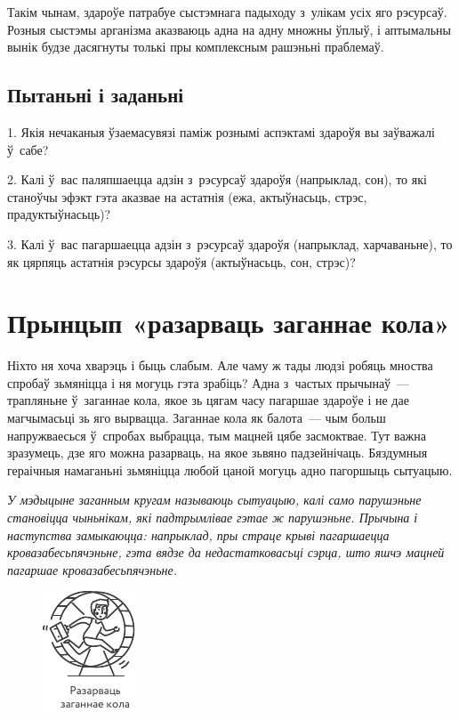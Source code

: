 Такім чынам, здароўе патрабуе сыстэмнага падыходу з~улікам усіх яго рэсурсаў. Розныя сыстэмы арганізма аказваюць адна на адну множны ўплыў, і аптымальны вынік будзе дасягнуты толькі пры комплексным рашэньні праблемаў.

\subsection*{Пытаньні і заданьні}

1. Якія нечаканыя ўзаемасувязі паміж рознымі аспэктамі здароўя вы заўважалі ў~сабе?

2. Калі ў~вас паляпшаецца адзін з~рэсурсаў здароўя (напрыклад, сон), то які станоўчы эфэкт гэта аказвае на астатнія (ежа, актыўнасьць, стрэс, прадуктыўнасьць)?

3. Калі ў~вас пагаршаецца адзін з~рэсурсаў здароўя (напрыклад, харчаваньне), то як цярпяць астатнія рэсурсы здароўя (актыўнасьць, сон, стрэс)?


\section{Прынцып «разарваць заганнае кола»}

Ніхто ня хоча хварэць і быць слабым. Але чаму ж тады людзі робяць мноства спробаў зьмяніцца і ня могуць гэта зрабіць? Адна з~частых прычынаў~--- трапляньне ў~заганнае кола, якое зь цягам часу пагаршае здароўе і не дае магчымасьці зь яго вырвацца. Заганнае кола як балота~--- чым больш напружваесься ў~спробах выбрацца, тым мацней цябе засмоктвае. Тут важна зразумець, дзе яго можна разарваць, на якое зьвяно падзейнічаць. Бяздумныя гераічныя намаганьні зьмяніцца любой цаной могуць адно пагоршыць сытуацыю.

\emph{У мэдыцыне заганным кругам называюць сытуацыю, калі само парушэньне становіцца чыньнікам, які падтрымлівае гэтае ж парушэньне. Прычына і наступства замыкаюцца: напрыклад, пры страце крыві пагаршаецца кровазабесьпячэньне, гэта вядзе да недастатковасьці сэрца, што яшчэ мацней пагаршае кровазабесьпячэньне.}

\begin{figure}[htb!]
  \centering
  \includegraphics[scale=1.5]{willpower/ch3/16.pdf}
\end{figure}


